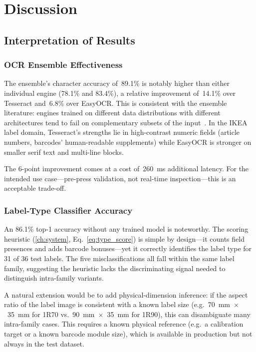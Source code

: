 \chapter{Discussion}
\label{ch:discussion}

\section{Interpretation of Results}

\subsection{OCR Ensemble Effectiveness}

The ensemble's character accuracy of~89.1\% is notably higher than either individual
engine (78.1\% and 83.4\%), a relative improvement of~14.1\% over Tesseract and~6.8\%
over EasyOCR. This is consistent with the ensemble literature: engines trained on different
data distributions with different architectures tend to fail on complementary subsets of the
input~\cite{ratzlaff2003method}. In the IKEA label domain, Tesseract's strengths lie in
high-contrast numeric fields (article numbers, barcodes' human-readable supplements) while
EasyOCR is stronger on smaller serif text and multi-line blocks.

The 6-point improvement comes at a cost of~260~ms additional latency. For the intended
use case—pre-press validation, not real-time inspection—this is an acceptable trade-off.

\subsection{Label-Type Classifier Accuracy}

An 86.1\% top-1 accuracy without any trained model is noteworthy. The scoring heuristic
(\cref{ch:system}, Eq.~\ref{eq:type_score}) is simple by design—it counts field presences
and adds barcode bonuses—yet it correctly identifies the label type for 31 of 36 test labels.
The five misclassifications all fall within the same label family, suggesting the heuristic
lacks the discriminating signal needed to distinguish intra-family variants.

A natural extension would be to add physical-dimension inference: if the aspect ratio of
the label image is consistent with a known label size (e.g.~70~mm~$\times$~35~mm for 1R70
vs.~90~mm~$\times$~35~mm for 1R90), this can disambiguate many intra-family cases. This
requires a known physical reference (e.g.\ a calibration target or a known barcode module
size), which is available in production but not always in the test dataset.

